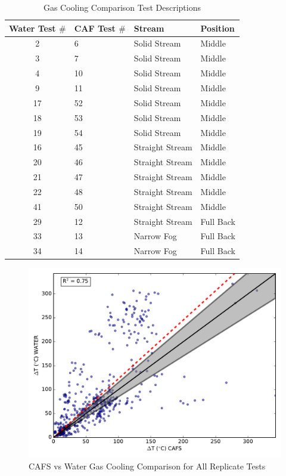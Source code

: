 \documentclass[12pt,oneside]{book}
\begin{document}
\begin{table}[!ht]
\centering
\caption{Gas Cooling Comparison Test Descriptions}\label{tab:Gas_Cooling_Descriptions}
\begin{tabular}{clll}
\toprule[1.5pt]
Water Test $\#$  & CAF Test  $\#$	& Stream			  & Position  \\
\midrule
 2               & 6                &  Solid Stream       &  Middle   \\
 3               & 7                &  Solid Stream       &  Middle   \\
 4               & 10               &  Solid Stream       &  Middle   \\
 9               & 11               &  Solid Stream       &  Middle   \\
 17              & 52               &  Solid Stream       &  Middle   \\
 18              & 53               &  Solid Stream       &  Middle   \\
 19              & 54               &  Solid Stream       &  Middle   \\
 16              & 45               &  Straight Stream    &  Middle   \\
 20              & 46               &  Straight Stream    &  Middle   \\
 21              & 47               &  Straight Stream    &  Middle   \\
 22              & 48               &  Straight Stream    &  Middle   \\
 41              & 50               &  Straight Stream    &  Middle   \\
 29              & 12               &  Straight Stream    &  Full Back   \\
 33              & 13               &  Narrow Fog   	  &  Full Back   \\
 34              & 14               &  Narrow Fog   	  &  Full Back   \\
\bottomrule[1.25pt]
\end{tabular}\par
\end{table}

\begin{figure}[!ht]
	\includegraphics[width=.7\columnwidth]{../Figures/Gas_Cooling/Combined_scatter}
	\caption{CAFS vs Water Gas Cooling Comparison for All Replicate Tests}
	\label{fig:combined_all}
\end{figure}
\end{document}

